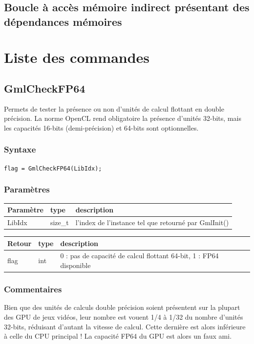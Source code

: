 \documentclass[a4paper,12pt]{article}
\begin{document}
\subsection{Boucle à accès mémoire indirect présentant des dépendances mémoires}


%
%

\section{Liste des commandes}

\subsection{GmlCheckFP64}

Permets de tester la présence ou non d'unités de calcul flottant en double précision.
La norme OpenCL rend obligatoire la présence d'unités 32-bits, mais les capacités 16-bits (demi-précision) et 64-bits sont optionnelles.

\subsubsection*{Syntaxe}
{\tt flag = GmlCheckFP64(LibIdx);}
\subsubsection*{Paramètres}

\begin{tabular}{|m{2cm}|m{1.5cm}|m{10.5cm}|}
\hline
Paramètre  & type    & description \\
\hline
LibIdx     & size\_t & l'index de l'instance tel que retourné par GmlInit() \\
\hline
\end{tabular}

\medskip

\begin{tabular}{|m{2cm}|m{1.5cm}|m{10.5cm}|}
\hline
Retour     & type   & description \\
\hline
flag       & int    & 0 : pas de capacité de calcul flottant 64-bit, 1 : FP64 disponible \\
\hline
\end{tabular}
\subsubsection*{Commentaires}
Bien que des unités de calculs double précision soient présentent sur la plupart des GPU de jeux vidéos, leur nombre est vouent 1/4 à 1/32 du nombre d'unités 32-bits, réduisant d'autant la vitesse de calcul.
Cette dernière est alors inférieure à celle du CPU principal !
La capacité FP64 du GPU est alors un faux ami.
\end{document}
